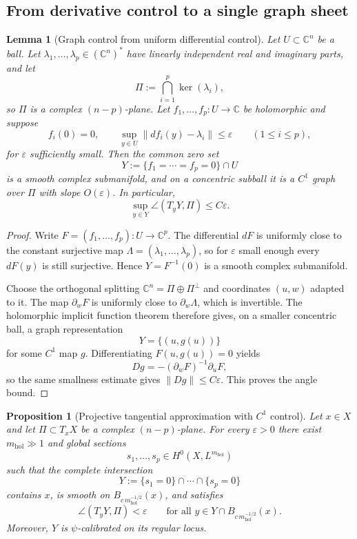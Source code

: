 \documentclass[11pt]{article}
\numberwithin{equation}{section}
\theoremstyle{plain}
\newtheorem{proposition}[theorem]{Proposition}
\newtheorem{lemma}[theorem]{Lemma}
\theoremstyle{definition}
\theoremstyle{remark}
\newcommand{\C}{\mathbb{C}}
\newcommand{\eps}{\varepsilon}
\newcommand{\mhol}{m_{\mathrm{hol}}}
\begin{document}
\subsection{From derivative control to a single graph sheet}

\begin{lemma}[Graph control from uniform differential control]\label{lem:graph}
Let $U \subset \C^n$ be a ball.  Let $\lambda_1,\dots,\lambda_p \in (\C^n)^*$ have linearly independent real and imaginary parts, and let
\[
\Pi := \bigcap_{i=1}^p \ker(\lambda_i),
\]
so $\Pi$ is a complex $(n-p)$-plane.  Let $f_1,\dots,f_p : U \to \C$ be holomorphic and suppose
\[
f_i(0)=0,
\qquad
\sup_{y \in U}\|df_i(y)-\lambda_i\| \le \eps
\qquad
(1\le i \le p),
\]
for $\eps$ sufficiently small.  Then the common zero set
\[
Y := \{f_1=\cdots=f_p=0\}\cap U
\]
is a smooth complex submanifold, and on a concentric subball it is a $C^1$ graph over $\Pi$ with slope $O(\eps)$.  In particular,
\[
\sup_{y \in Y}\angle(T_yY,\Pi) \le C\eps.
\]
\end{lemma}

\begin{proof}
Write $F=(f_1,\dots,f_p):U \to \C^p$.  The differential $dF$ is uniformly close to the constant surjective map $\Lambda=(\lambda_1,\dots,\lambda_p)$, so for $\eps$ small enough every $dF(y)$ is still surjective.  Hence $Y=F^{-1}(0)$ is a smooth complex submanifold.

Choose the orthogonal splitting $\C^n = \Pi \oplus \Pi^\perp$ and coordinates $(u,w)$ adapted to it.  The map $\partial_w F$ is uniformly close to $\partial_w \Lambda$, which is invertible.  The holomorphic implicit function theorem therefore gives, on a smaller concentric ball, a graph representation
\[
Y = \{(u,g(u))\}
\]
for some $C^1$ map $g$.  Differentiating $F(u,g(u))=0$ yields
\[
Dg = -(\partial_w F)^{-1}\partial_u F,
\]
so the same smallness estimate gives $\|Dg\| \le C\eps$.  This proves the angle bound.
\end{proof}

\begin{proposition}[Projective tangential approximation with $C^1$ control]\label{prop:tangent}
Let $x \in X$ and let $\Pi \subset T_xX$ be a complex $(n-p)$-plane.  For every $\eps>0$ there exist $\mhol \gg 1$ and global sections
\[
s_1,\dots,s_p \in H^0(X,L^{\mhol})
\]
such that the complete intersection
\[
Y := \{s_1=0\}\cap\cdots\cap\{s_p=0\}
\]
contains $x$, is smooth on $B_{c\,\mhol^{-1/2}}(x)$, and satisfies
\[
\angle(T_yY,\Pi) < \eps
\qquad
\text{for all } y \in Y \cap B_{c\,\mhol^{-1/2}}(x).
\]
Moreover, $Y$ is $\psi$-calibrated on its regular locus.
\end{proposition}
\end{document}
